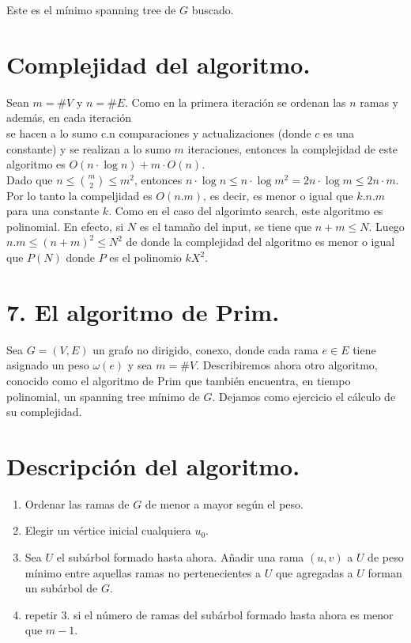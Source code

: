 \documentclass[10pt]{article}
\begin{document}
Este es el mínimo spanning tree de $G$ buscado.

\section*{Complejidad del algoritmo.}
Sean $m=\# V$ y $n=\# E$. Como en la primera iteración se ordenan las $n$ ramas y además, en cada iteración\\
se hacen a lo sumo c.n comparaciones y actualizaciones (donde $c$ es una constante) y se realizan a lo sumo $m$ iteraciones, entonces la complejidad de este algoritmo es $O(n \cdot \log n)+m \cdot O(n)$.\\
Dado que $n \leq\binom{ m}{2} \leq m^{2}$, entonces $n \cdot \log n \leq n \cdot \log m^{2}=2 n \cdot \log m \leq 2 n \cdot m$. Por lo tanto la compeljidad es $O(n . m)$, es decir, es menor o igual que $k . n . m$ para una constante $k$. Como en el caso del algorimto search, este algoritmo es polinomial. En efecto, si $N$ es el tamaño del input, se tiene que $n+m \leq N$. Luego $n . m \leq(n+m)^{2} \leq N^{2}$ de donde la complejidad del algoritmo es menor o igual que $P(N)$ donde $P$ es el polinomio $k X^{2}$.

\section*{7. El algoritmo de Prim.}
Sea $G=(V, E)$ un grafo no dirigido, conexo, donde cada rama $e \in E$ tiene asignado un peso $\omega(e)$ y sea $m=\# V$. Describiremos ahora otro algoritmo, conocido como el algoritmo de Prim que también encuentra, en tiempo polinomial, un spanning tree mínimo de $G$. Dejamos como ejercicio el cálculo de su complejidad.

\section*{Descripción del algoritmo.}
\begin{enumerate}
  \item Ordenar las ramas de $G$ de menor a mayor según el peso.
  \item Elegir un vértice inicial cualquiera $u_{0}$.
  \item Sea $U$ el subárbol formado hasta ahora. Añadir una rama $(u, v)$ a $U$ de peso mínimo entre aquellas ramas no pertenecientes a $U$ que agregadas a $U$ forman un subárbol de $G$.
  \item repetir 3. si el número de ramas del subárbol formado hasta ahora es menor que $m-1$.
\end{enumerate}
\end{document}

